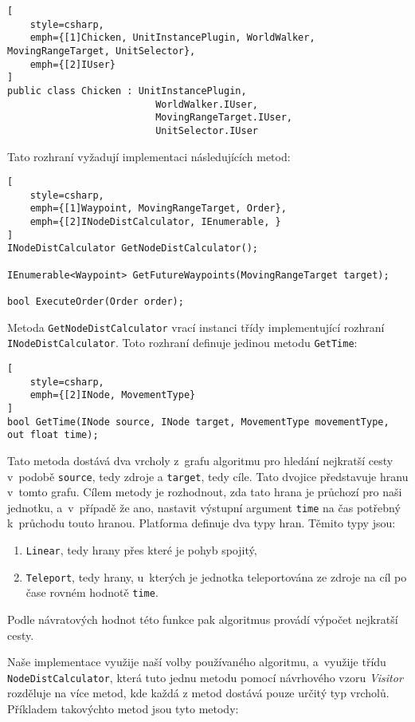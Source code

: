 \begin{lstlisting}[
	style=csharp,
	emph={[1]Chicken, UnitInstancePlugin, WorldWalker, MovingRangeTarget, UnitSelector},
	emph={[2]IUser}
]
public class Chicken : UnitInstancePlugin, 
                          WorldWalker.IUser, 
                          MovingRangeTarget.IUser,
                          UnitSelector.IUser
\end{lstlisting}

Tato rozhraní vyžadují implementaci následujících metod:
\begin{lstlisting}[
	style=csharp,
	emph={[1]Waypoint, MovingRangeTarget, Order},
	emph={[2]INodeDistCalculator, IEnumerable, }
]
INodeDistCalculator GetNodeDistCalculator();

IEnumerable<Waypoint> GetFutureWaypoints(MovingRangeTarget target);

bool ExecuteOrder(Order order);
\end{lstlisting}

Metoda \texttt{GetNodeDistCalculator} vrací instanci třídy implementující rozhraní \texttt{INodeDistCalculator}. Toto rozhraní definuje jedinou metodu \texttt{GetTime}:

\begin{lstlisting}[
	style=csharp,
	emph={[2]INode, MovementType}
]
bool GetTime(INode source, INode target, MovementType movementType, out float time);
\end{lstlisting}

Tato metoda dostává dva vrcholy z~grafu algoritmu pro hledání nejkratší cesty v~podobě \texttt{source}, tedy zdroje a \texttt{target}, tedy cíle. Tato dvojice představuje hranu v~tomto grafu. Cílem metody je rozhodnout, zda tato hrana je průchozí pro naši jednotku, a~v~případě že ano, nastavit výstupní argument \texttt{time} na čas potřebný k~průchodu touto hranou. Platforma definuje dva typy hran. Těmito typy jsou:
\begin{enumerate}
	\item \texttt{Linear}, tedy hrany přes které je pohyb spojitý,
	\item \texttt{Teleport}, tedy hrany, u~kterých je jednotka teleportována ze zdroje na cíl po čase rovném hodnotě \texttt{time}.
\end{enumerate}

Podle návratových hodnot této funkce pak algoritmus provádí výpočet nejkratší cesty. 

Naše implementace využije naší volby používaného algoritmu, a~využije třídu \texttt{NodeDistCalculator}, která tuto jednu metodu pomocí návrhového vzoru \textit{Visitor} rozděluje na více metod, kde každá z metod dostává pouze určitý typ vrcholů. Příkladem takovýchto metod jsou tyto metody:

